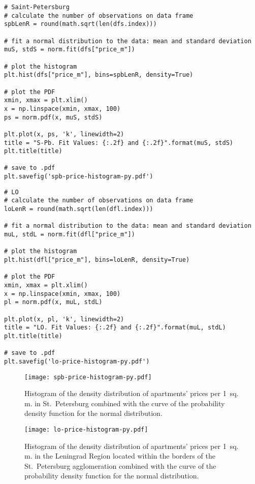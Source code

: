 \documentclass[]{scrreprt}
\begin{document}
%
\begin{lstlisting}[float=htp, caption = Histogram plotting for St.~Petersburg., firstnumber=1, label= lst:price-hist-spb]
# Saint-Petersburg
# calculate the number of observations on data frame
spbLenR = round(math.sqrt(len(dfs.index)))

# fit a normal distribution to the data: mean and standard deviation
muS, stdS = norm.fit(dfs["price_m"])

# plot the histogram
plt.hist(dfs["price_m"], bins=spbLenR, density=True)

# plot the PDF
xmin, xmax = plt.xlim()
x = np.linspace(xmin, xmax, 100)
ps = norm.pdf(x, muS, stdS)

plt.plot(x, ps, 'k', linewidth=2)
title = "S-Pb. Fit Values: {:.2f} and {:.2f}".format(muS, stdS)
plt.title(title)

# save to .pdf
plt.savefig('spb-price-histogram-py.pdf')
\end{lstlisting}
%
\begin{lstlisting}[float=htp, caption = Histogram plotting for the Leningrad Region, firstnumber=1, label= lst:price-hist-lo]
# LO
# calculate the number of observations on data frame
loLenR = round(math.sqrt(len(dfl.index)))

# fit a normal distribution to the data: mean and standard deviation
muL, stdL = norm.fit(dfl["price_m"])

# plot the histogram
plt.hist(dfl["price_m"], bins=loLenR, density=True)

# plot the PDF
xmin, xmax = plt.xlim()
x = np.linspace(xmin, xmax, 100)
pl = norm.pdf(x, muL, stdL)

plt.plot(x, pl, 'k', linewidth=2)
title = "LO. Fit Values: {:.2f} and {:.2f}".format(muL, stdL)
plt.title(title)

# save to .pdf
plt.savefig('lo-price-histogram-py.pdf')
\end{lstlisting} 
%
\begin{figure}[htp]
	\centering
	\texttt{[image: spb-price-histogram-py.pdf]}
	\caption{Histogram of the density distribution of apartments' prices per 1~sq.\,m. in St.~Petersburg combined with the curve of the probability density function for the normal distribution.}
	\label{fig:spb-prices-hist}
\end{figure}
%
\begin{figure}[htp]
	\centering
	\texttt{[image: lo-price-histogram-py.pdf]}
	\caption{Histogram of the density distribution of apartments' prices per 1~sq.\,m. in the Leningrad Region located within the borders of the St.~Petersburg agglomeration combined with the curve of the probability density function for the normal distribution.}
	\label{fig:lo-prices-hist}
\end{figure}
%
\end{document}
